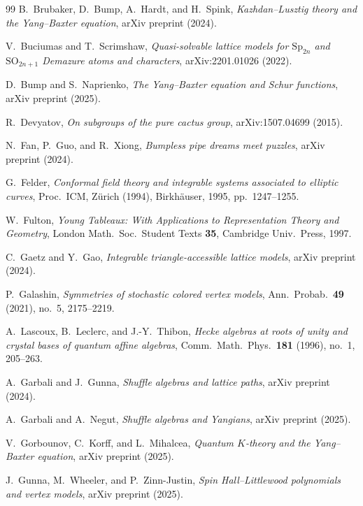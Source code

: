 \documentclass[11pt,a4paper]{article}
\theoremstyle{plain}
\theoremstyle{definition}
\theoremstyle{remark}
\begin{document}
\begin{thebibliography}{99}
B.~Brubaker, D.~Bump, A.~Hardt, and H.~Spink,
\emph{Kazhdan--Lusztig theory and the Yang--Baxter equation},
arXiv preprint (2024).

V.~Buciumas and T.~Scrimshaw,
\emph{Quasi-solvable lattice models for $\mathrm{Sp}_{2n}$ and $\mathrm{SO}_{2n+1}$ Demazure atoms and characters},
arXiv:2201.01026 (2022).

D.~Bump and S.~Naprienko,
\emph{The Yang--Baxter equation and Schur functions},
arXiv preprint (2025).

R.~Devyatov,
\emph{On subgroups of the pure cactus group},
arXiv:1507.04699 (2015).

N.~Fan, P.~Guo, and R.~Xiong,
\emph{Bumpless pipe dreams meet puzzles},
arXiv preprint (2024).

G.~Felder,
\emph{Conformal field theory and integrable systems associated to elliptic curves},
Proc.\ ICM, Z\"urich (1994), Birkh\"auser, 1995, pp.~1247--1255.

W.~Fulton,
\emph{Young Tableaux: With Applications to Representation Theory and Geometry},
London Math.\ Soc.\ Student Texts \textbf{35}, Cambridge Univ.\ Press, 1997.

C.~Gaetz and Y.~Gao,
\emph{Integrable triangle-accessible lattice models},
arXiv preprint (2024).

P.~Galashin,
\emph{Symmetries of stochastic colored vertex models},
Ann.\ Probab.\ \textbf{49} (2021), no.~5, 2175--2219.

A.~Lascoux, B.~Leclerc, and J.-Y.~Thibon,
\emph{Hecke algebras at roots of unity and crystal bases of quantum affine algebras},
Comm.\ Math.\ Phys.\ \textbf{181} (1996), no.~1, 205--263.

A.~Garbali and J.~Gunna,
\emph{Shuffle algebras and lattice paths},
arXiv preprint (2024).

A.~Garbali and A.~Negut,
\emph{Shuffle algebras and Yangians},
arXiv preprint (2025).

V.~Gorbounov, C.~Korff, and L.~Mihalcea,
\emph{Quantum $K$-theory and the Yang--Baxter equation},
arXiv preprint (2025).

J.~Gunna, M.~Wheeler, and P.~Zinn-Justin,
\emph{Spin Hall--Littlewood polynomials and vertex models},
arXiv preprint (2025).


\end{thebibliography}
\end{document}
